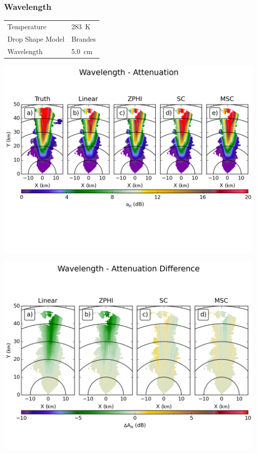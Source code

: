 \documentclass[red]{beamer}
\begin{document}
\begin{frame}
	\frametitle{Wavelength}
	\begin{center}
	    \begin{tabular}{ | l | l | }
	        \hline
	        Temperature & \SI{283}{\kelvin} \\
	        Drop Shape Model & Brandes \\
	        Wavelength & \SI{5.0}{\centi\meter} \\
			\hline
	    \end{tabular}
	\end{center}	
\end{frame}

\begin{frame}
	\begin{center}
		\includegraphics[scale=0.55]{figures/C_Wavelength_Attenuation.png}
	\end{center}
\end{frame}

\begin{frame}
	\begin{center}
		\includegraphics[scale=0.45]{figures/C_Wavelength_Attenuation_Difference.png}
	\end{center}
\end{frame}
\end{document}

